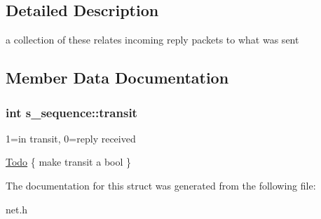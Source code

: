 \subsection{Detailed Description}
a collection of these relates incoming reply packets to what was sent 

\subsection{Member Data Documentation}
\hypertarget{structs__sequence_23243cbea1f63fecfb2c0fb863e8d8d6}{
\subsubsection[transit]{\setlength{\rightskip}{0pt plus 5cm}int {\bf s\_\-sequence::transit}}}
\label{structs__sequence_23243cbea1f63fecfb2c0fb863e8d8d6}


1=in transit, 0=reply received \begin{Desc}
\item[\hyperlink{todo__todo000004}{Todo}]\{ make transit a bool \} \end{Desc}


The documentation for this struct was generated from the following file:\begin{CompactItemize}
\item 
net.h\end{CompactItemize}
